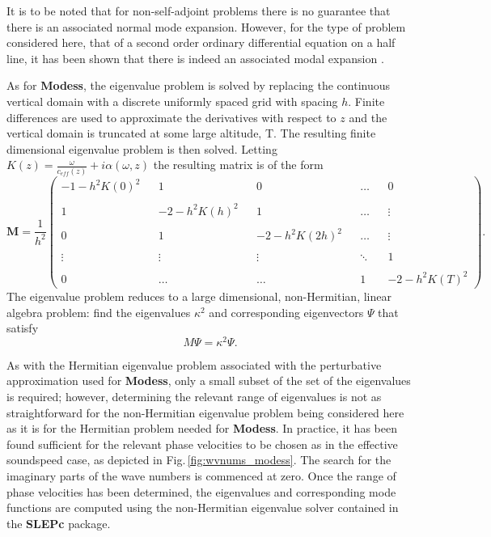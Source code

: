 It is to be noted that for non-self-adjoint problems there is no guarantee that there is an associated normal mode expansion. However, for the type of problem considered here, that of a second order ordinary differential equation on a half line, it has been shown that there is indeed an associated modal expansion \cite{Dunford_Schwartz_3}.

As for {\bf Modess}, the eigenvalue problem is solved by replacing the continuous vertical domain with a discrete uniformly spaced grid with spacing $h$. Finite differences are used to approximate the derivatives with respect to $z$ and the vertical domain is truncated at some large altitude, T. The resulting finite dimensional eigenvalue problem is then solved. Letting $K(z)=\frac{\omega}{c_{eff}(z)}+i\alpha(\omega,z)$ the resulting matrix is of the form
\[
\textbf{M}
=
\frac{1}{h^2}\begin{pmatrix}
-1 - h^2K(0)^2 && 1 && 0 && \hdots && 0\\ \\
1 && -2 - h^2K(h)^2&& 1 && \hdots && \vdots\\ \\
0 && 1 && -2  - h^2K(2h)^2&& \hdots && \vdots\\ \\
\vdots && \vdots && \vdots && \ddots && 1 \\ \\
0 && \hdots && \hdots && 1 && -2  - h^2K(T)^2
\end{pmatrix}.
\]
The eigenvalue problem reduces to a large dimensional, non-Hermitian, linear algebra problem: find the eigenvalues $\kappa^2$ and corresponding eigenvectors $\Psi$ that satisfy 
\[
M\Psi=\kappa^2\Psi. 
\]

As with the Hermitian eigenvalue problem associated with the perturbative approximation used for {\bf Modess}, only a small subset of the set of the eigenvalues is required; however, determining the relevant range of eigenvalues is not as straightforward for the non-Hermitian eigenvalue problem being considered here as it is for the Hermitian problem needed for {\bf Modess}. In practice, it has been found sufficient for the relevant phase velocities to be chosen as in the effective soundspeed case, as depicted in Fig.\,\ref{fig:wvnums_modess}. The search for the imaginary parts of the wave numbers is commenced at zero. Once the range of phase velocities has been determined, the eigenvalues and corresponding mode functions are computed using the non-Hermitian eigenvalue solver contained in the \textbf{SLEPc} package. 


